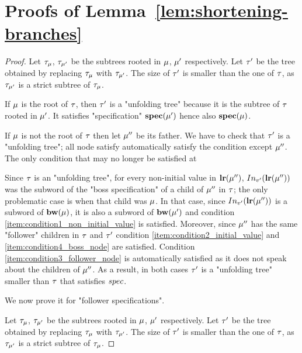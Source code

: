 \section{Proofs of Lemma~\ref{lem:shortening-branches}}
\label{app:proofs-reduction-branches}

\lemShorteningBranches*

\begin{proof}
	Let $\tau_{\mu}$, $\tau_{\mu'}$ be the subtrees rooted in $\mu$, $\mu'$ respectively. 
	Let $\tau'$ be the tree obtained by replacing $\tau_{\mu}$ with $\tau_{\mu'}$. The size of $\tau'$ is smaller than the one of $\tau$, as $\tau_{\mu'}$ is a strict subtree of $\tau_{\mu}$.
	
	If $\mu$ is the root of $\tau$, then $\tau'$ is a "unfolding tree" because it is the subtree of $\tau$ rooted in $\mu'$. It satisfies "specification" $\mathbf{spec}(\mu')$ hence also $\mathbf{spec}(\mu)$. 
	
	If $\mu$ is not the root of $\tau$ then let $\mu''$ be its father. We have to check that $\tau'$ is a "unfolding tree"; all node satisfy automatically satisfy the condition except $\mu''$. The only condition that may no longer be satisfied at  

	Since $\tau$ is an "unfolding tree", for every non-initial value in $\mathbf{lr}(\mu'')$, $\vinput{v'}{\localrunlabel{\node''}}$ was the subword of the "boss specification" of a child of $\mu''$ in $\tau$; the only problematic case is when that child was $\mu$. In that case, since $\vinput{v'}{\localrunlabel{\node''}}$ is a subword of $\mathbf{bw}(\mu)$, it is also a subword of $\mathbf{bw}(\mu')$ and condition \ref{item:condition1_non_initial_value} is satisfied.
	Moreover, since $\mu''$ has the same "follower" children in $\tau$ and $\tau'$ condition \ref{item:condition2_initial_value} and \ref{item:condition4_boss_node} are satisfied. Condition \ref{item:condition3_follower_node} is automatically satisfied as it does not speak about the children of $\mu''$. 
	As a result, in both cases $\tau'$ is a "unfolding tree" smaller than $\tau$ that satisfies $\spec$. 

	We now prove it for "follower specifications". 

	Let $\tau_{\mu}$, $\tau_{\mu'}$ be the subtrees rooted in $\mu$, $\mu'$ respectively. 
	Let $\tau'$ be the tree obtained by replacing $\tau_{\mu}$ with $\tau_{\mu'}$. The size of $\tau'$ is smaller than the one of $\tau$, as $\tau_{\mu'}$ is a strict subtree of $\tau_{\mu}$.
	

\end{proof}
